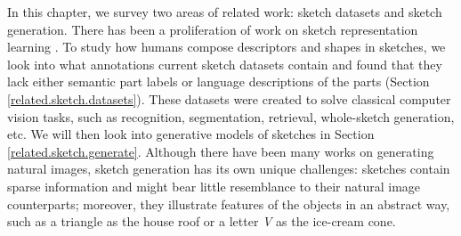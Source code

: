
In this chapter, we survey two areas of related work: sketch datasets and sketch generation. 
There has been a proliferation of work on sketch representation learning \citep{ha2017neural,  eitz2012hdhso,spg_paper, qmulDataset, doodlerGAN, kim2019codraw, aksan2020cose, ribeiro2020sketchformer, Sketchpix2seqPaper, sketchBertPaper}. 
To study how humans compose descriptors and shapes in sketches, we look into what annotations current sketch datasets contain and found that they lack either semantic part labels or language descriptions of the parts (Section \ref{related.sketch.datasets}).    
These datasets were created to solve classical computer vision tasks, such as recognition, segmentation, retrieval, whole-sketch generation, etc. 
We will then look into generative models of sketches in Section \ref{related.sketch.generate}. Although there have been many works on generating natural images, sketch generation has its own unique challenges: sketches contain sparse information and might bear little resemblance to their natural image counterparts; moreover, they illustrate features of the objects in an abstract way, such as a triangle as the house roof or a letter \textit{V} as the ice-cream cone. 
%  




